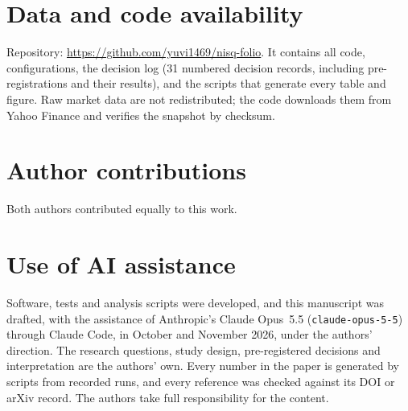 \documentclass[11pt]{article}
\begin{document}
\section*{Data and code availability}
Repository: \url{https://github.com/yuvi1469/nisq-folio}. It contains all code, configurations,
the decision log (31 numbered decision records, including pre-registrations and their results),
and the scripts that generate every table and figure. Raw market data are not redistributed; the code
downloads them from Yahoo Finance and verifies the snapshot by checksum.

\section*{Author contributions}
Both authors contributed equally to this work.

\section*{Use of AI assistance}
Software, tests and analysis scripts were developed, and this manuscript was drafted, with the
assistance of Anthropic's Claude Opus~5.5 (\texttt{claude-opus-5-5}) through Claude Code, in
October and November 2026, under the authors' direction. The research questions, study design,
pre-registered decisions and interpretation are the authors' own. Every number in the paper is
generated by scripts from recorded runs, and every reference was checked against its DOI or arXiv
record. The authors take full responsibility for the content.



\end{document}
